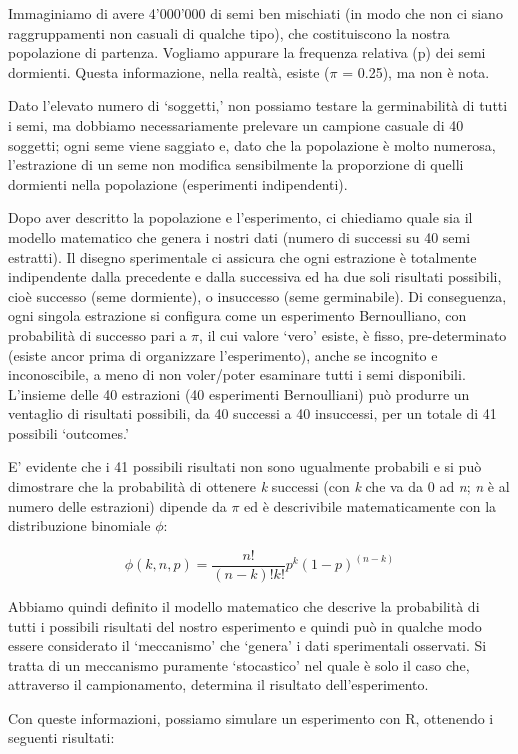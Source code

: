 \documentclass[a4paper,12pt,oneside]{book}
\begin{document}
Immaginiamo di avere 4'000'000 di semi ben mischiati (in modo che non ci siano raggruppamenti non casuali di qualche tipo), che costituiscono la nostra popolazione di partenza. Vogliamo appurare la frequenza relativa (p) dei semi dormienti. Questa informazione, nella realtà, esiste (\(\pi\) = 0.25), ma non è nota.

Dato l'elevato numero di `soggetti,' non possiamo testare la germinabilità di tutti i semi, ma dobbiamo necessariamente prelevare un campione casuale di 40 soggetti; ogni seme viene saggiato e, dato che la popolazione è molto numerosa, l'estrazione di un seme non modifica sensibilmente la proporzione di quelli dormienti nella popolazione (esperimenti indipendenti).

Dopo aver descritto la popolazione e l'esperimento, ci chiediamo quale sia il modello matematico che genera i nostri dati (numero di successi su 40 semi estratti). Il disegno sperimentale ci assicura che ogni estrazione è totalmente indipendente dalla precedente e dalla successiva ed ha due soli risultati possibili, cioè successo (seme dormiente), o insuccesso (seme germinabile). Di conseguenza, ogni singola estrazione si configura come un esperimento Bernoulliano, con probabilità di successo pari a \(\pi\), il cui valore `vero' esiste, è fisso, pre-determinato (esiste ancor prima di organizzare l'esperimento), anche se incognito e inconoscibile, a meno di non voler/poter esaminare tutti i semi disponibili. L'insieme delle 40 estrazioni (40 esperimenti Bernoulliani) può produrre un ventaglio di risultati possibili, da 40 successi a 40 insuccessi, per un totale di 41 possibili `outcomes.'

E' evidente che i 41 possibili risultati non sono ugualmente probabili e si può dimostrare che la probabilità di ottenere \emph{k} successi (con \emph{k} che va da 0 ad \emph{n}; \emph{n} è al numero delle estrazioni) dipende da \(\pi\) ed è descrivibile matematicamente con la distribuzione binomiale \(\phi\):

\[\phi(k, n, p) = \frac{n!}{(n-k)!k!} p^k (1 - p)^{(n-k)}\]

Abbiamo quindi definito il modello matematico che descrive la probabilità di tutti i possibili risultati del nostro esperimento e quindi può in qualche modo essere considerato il `meccanismo' che `genera' i dati sperimentali osservati. Si tratta di un meccanismo puramente `stocastico' nel quale è solo il caso che, attraverso il campionamento, determina il risultato dell'esperimento.

Con queste informazioni, possiamo simulare un esperimento con R, ottenendo i seguenti risultati:
\end{document}
